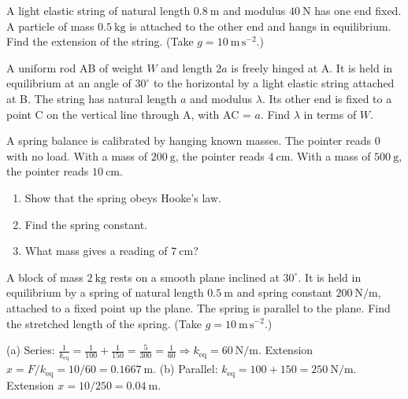 \documentclass[11pt]{article}
\begin{document}
\begin{exercice}[Exercise 7]
A light elastic string of natural length $0.8\ \mathrm{m}$ and modulus $40\ \mathrm{N}$ has one end fixed. A particle of mass $0.5\ \mathrm{kg}$ is attached to the other end and hangs in equilibrium. Find the extension of the string. (Take $g = 10\ \mathrm{m\,s^{-2}}$.)
\end{exercice}

\begin{exercice}[Exercise 8]
A uniform rod AB of weight $W$ and length $2a$ is freely hinged at A. It is held in equilibrium at an angle of $30^\circ$ to the horizontal by a light elastic string attached at B. The string has natural length $a$ and modulus $\lambda$. Its other end is fixed to a point C on the vertical line through A, with AC = $a$. Find $\lambda$ in terms of $W$.
\end{exercice}

\begin{exercice}[Exercise 9]
A spring balance is calibrated by hanging known masses. The pointer reads $0$ with no load. With a mass of $200\ \mathrm{g}$, the pointer reads $4\ \mathrm{cm}$. With a mass of $500\ \mathrm{g}$, the pointer reads $10\ \mathrm{cm}$. 
\begin{enumerate}
\item[(a)] Show that the spring obeys Hooke's law.
\item[(b)] Find the spring constant.
\item[(c)] What mass gives a reading of $7\ \mathrm{cm}$?
\end{enumerate}
\end{exercice}

\begin{exercice}[Exercise 10]
A block of mass $2\ \mathrm{kg}$ rests on a smooth plane inclined at $30^\circ$. It is held in equilibrium by a spring of natural length $0.5\ \mathrm{m}$ and spring constant $200\ \mathrm{N/m}$, attached to a fixed point up the plane. The spring is parallel to the plane. Find the stretched length of the spring. (Take $g = 10\ \mathrm{m\,s^{-2}}$.)
\end{exercice}

\begin{corrige}[Exercise 6]
(a) Series: $\frac{1}{k_{\text{eq}}} = \frac{1}{100} + \frac{1}{150} = \frac{5}{300} = \frac{1}{60} \Rightarrow k_{\text{eq}} = 60\ \mathrm{N/m}$. Extension $x = F/k_{\text{eq}} = 10/60 = 0.1667\ \mathrm{m}$.
(b) Parallel: $k_{\text{eq}} = 100 + 150 = 250\ \mathrm{N/m}$. Extension $x = 10/250 = 0.04\ \mathrm{m}$.
\end{corrige}
\end{document}
